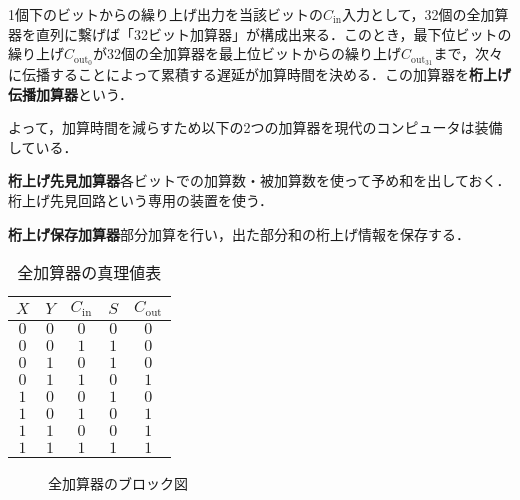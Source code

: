 1個下のビットからの繰り上げ出力を当該ビットの$C_{\mathrm{in}}$入力として，32個の全加算器を直列に繫げば「32ビット加算器」が構成出来る．このとき，最下位ビットの繰り上げ$C_{\mathrm{out}_0}$が32個の全加算器を最上位ビットからの繰り上げ$C_{\mathrm{out}_{31}}$まで，次々に伝播することによって累積する遅延が加算時間を決める．この加算器を\textbf{桁上げ伝播加算器}という．

よって，加算時間を減らすため以下の2つの加算器を現代のコンピュータは装備している．

\begin{enumerate}[label=\textbf{[\arabic*]}, labelsep=10pt, leftmargin=23pt]
	\item \textbf{桁上げ先見加算器}\qquad 各ビットでの加算数・被加算数を使って予め和を出しておく．桁上げ先見回路という専用の装置を使う．
	\item \textbf{桁上げ保存加算器}\qquad 部分加算を行い，出た部分和の桁上げ情報を保存する．
\end{enumerate}

\begin{table}[H]
	\caption{全加算器の真理値表}
	\label{tab14-3}
	\centering
	\begin{tabular}{c|c|c||c|c}
		\hline
		$X$ & $Y$ & $C_{\mathrm{in}}$ & $S$ & $C_{\mathrm{out}}$\\
        \hline\hline
        $0$ & $0$ & $0$ & $0$ & $0$\\
        $0$ & $0$ & $1$ & $1$ & $0$\\
        $0$ & $1$ & $0$ & $1$ & $0$\\
        $0$ & $1$ & $1$ & $0$ & $1$\\
        $1$ & $0$ & $0$ & $1$ & $0$\\
        $1$ & $0$ & $1$ & $0$ & $1$\\
        $1$ & $1$ & $0$ & $0$ & $1$\\
        $1$ & $1$ & $1$ & $1$ & $1$\\
		\hline
	\end{tabular}
\end{table}

\begin{figure}[H]
	\begin{center}
		\caption{全加算器のブロック図}
		\label{fig27-4}
	\end{center}
\end{figure}



